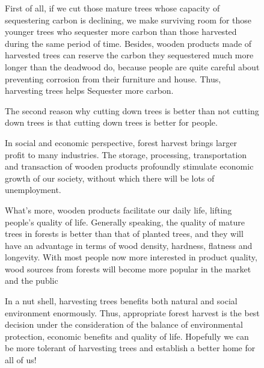\documentclass{mcmthesis}
\numberwithin{figure}{section}
\numberwithin{table}{section}
\numberwithin{equation}{section}
\begin{document}
\begin{memo}
\begin{figure}[ht]
\begin{minipage}[htbp]{0.475\linewidth}
    \end{minipage}
    \hfill
    \begin{minipage}[htbp]{0.475\linewidth}
      \indent\setlength{\parindent}{1em}
      \par
      First of all, if we cut those mature trees whose capacity of sequestering carbon is declining, 
      we make surviving room for those younger trees who sequester more carbon 
      than those harvested during the same period of time. 
      Besides, wooden products made of harvested trees can reserve the carbon they 
      sequestered much more longer than the deadwood do, because people are quite careful
      about preventing corrosion from their furniture and house. 
      Thus, harvesting trees helps Sequester more carbon.
      \par
      The second reason why cutting down trees is better than not cutting down trees is that 
      cutting down trees is better for people.
      \par
      In social and economic perspective, forest harvest brings larger profit to many 
      industries. The storage, processing, transportation and transaction of wooden 
      products profoundly stimulate economic growth of our society, without which 
      there will be lots of unemployment.
      \par
      What's more, wooden products facilitate our daily life, lifting people's quality 
      of life. Generally speaking, the quality of mature trees in forests is better 
      than that of planted trees, and they will have an advantage in terms of wood
      density, hardness, flatness and longevity. With most people now more interested 
      in product quality, wood sources from forests will become more popular in the 
      market and the public
      \par
      In a nut shell, harvesting trees benefits both natural and social environment 
      enormously. Thus, appropriate forest harvest is the best decision under the 
      consideration of the balance of environmental protection, economic benefits 
      and quality of life. Hopefully we can be more tolerant of harvesting trees and 
      establish a better home for all of us!

    \end{minipage}

  \end{figure}
\end{memo}




\newpage
\end{document}
